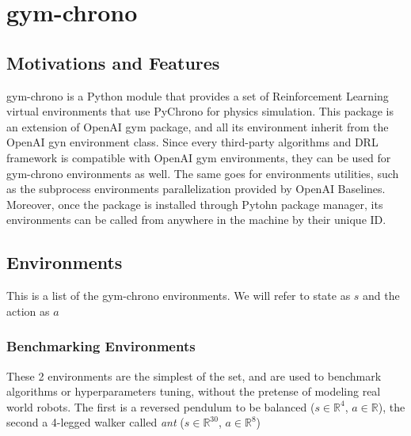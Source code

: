 \documentclass{svproc}
\begin{document}
\section{gym-chrono}
\subsection{Motivations and Features}
gym-chrono is a Python module that provides a set of Reinforcement Learning virtual environments that use PyChrono for physics simulation. This package is an extension of OpenAI gym package, and all its environment inherit from the OpenAI gyn environment class. Since every third-party algorithms and DRL framework is compatible with OpenAI gym environments, they can be used for gym-chrono environments as well. The same goes for environments utilities, such as the subprocess environments parallelization provided by OpenAI Baselines. Moreover, once the package is installed through Pytohn package manager, its environments can be called from anywhere in the machine by their unique ID.

\subsection{Environments}
This is a list of  the gym-chrono environments. We will refer to state as $s$ and the action as $a$
\subsubsection{Benchmarking Environments}
These 2 environments are the simplest of the set, and are used to benchmark algorithms or hyperparameters tuning, without the pretense of modeling real world robots. The first is a reversed pendulum to be balanced ($s \in \mathbb{R}^4$, $a \in \mathbb{R}$), the second a 4-legged walker called \textit{ant} ($s \in \mathbb{R}^{30}$, $a \in \mathbb{R}^8$)
\end{document}
